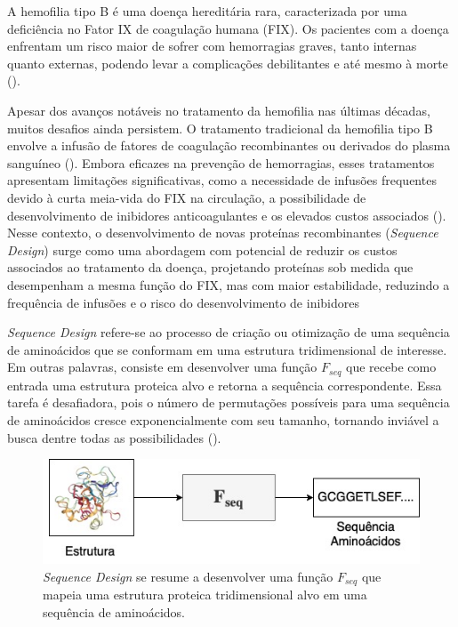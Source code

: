 \label{cap:introducao}
\enlargethispage{.5\baselineskip}

A hemofilia tipo B é uma doença hereditária rara, 
caracterizada por uma deficiência no Fator IX de coagulação humana (FIX). 
Os pacientes com a doença enfrentam um risco maior de sofrer com hemorragias graves, 
tanto internas quanto externas, 
podendo levar a complicações debilitantes e até mesmo à morte (\cite{Mannucci}).

Apesar dos avanços notáveis no tratamento da hemofilia nas últimas décadas,
muitos desafios ainda persistem.
O tratamento tradicional da hemofilia tipo B envolve a infusão de fatores de coagulação recombinantes
ou derivados do plasma sanguíneo (\cite{Gouw}). 
Embora eficazes na prevenção de hemorragias,
esses tratamentos apresentam limitações significativas,
como a necessidade de infusões frequentes devido à curta meia-vida do FIX na circulação,
a possibilidade de desenvolvimento de inibidores anticoagulantes e os elevados custos associados (\cite{Mancuso}).
Nesse contexto, o desenvolvimento de novas proteínas recombinantes (\textit{Sequence Design}) surge 
como uma abordagem com potencial de reduzir os custos associados ao tratamento da doença, 
projetando proteínas sob medida que desempenham a mesma função do FIX, mas com maior estabilidade,
reduzindo a frequência de infusões e o risco do desenvolvimento de inibidores


\textit{Sequence Design} refere-se ao processo de criação ou
otimização de uma sequência de aminoácidos que se conformam em uma estrutura tridimensional de interesse.
Em outras palavras, consiste em desenvolver uma função $F_{seq}$ que 
recebe como entrada uma estrutura proteica alvo e retorna a sequência correspondente. 
Essa tarefa é desafiadora, 
pois o número de permutações possíveis para uma sequência de aminoácidos
cresce exponencialmente com seu tamanho, 
tornando inviável a busca dentre todas as possibilidades (\cite{Overview}).

\begin{figure}[H]
  \caption[\textit{Sequence Design}]{\textit{Sequence Design} se resume a desenvolver uma 
  função $F_{seq}$ que mapeia uma estrutura proteica tridimensional alvo em uma sequência de aminoácidos.}
  \centering
  \includegraphics[width=.8\textwidth]{figuras/metodologia-SeqDes.jpg}
\end{figure}

